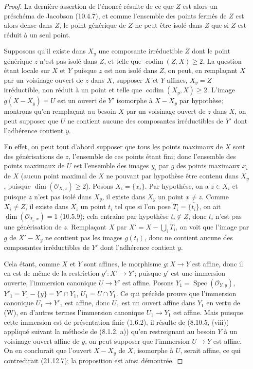 \begin{proof}
La dernière assertion de l'énoncé résulte de ce que $Z$ est alors un préschéma de
Jacobson (10.4.7), et comme l'ensemble des points fermés de $Z$ est alors dense dans
$Z$, le point générique de $Z$ ne peut être isolé dans $Z$ que si $Z$ est réduit à un
seul point.

Supposons qu'il existe dans $X_y$ une composante irréductible $Z$ dont le point
générique $z$ n'est pas isolé dans $Z$, et telle que $\operatorname{codim}(Z,X)\geq2$.
La question étant locale sur $X$ et $Y$ puisque $z$ est non isolé dans $Z$, on peut, en
remplaçant $X$ par un voisinage ouvert de $z$ dans $X$, supposer $X$ et $Y$ affines,
$X_y=Z$ irréductible, non réduit à un point et telle que
$\operatorname{codim}(X_y,X)\geq2$. L'image $g(X-X_y)=U$ est un ouvert de $Y'$
isomorphe à $X-X_y$ par hypothèse; montrons qu'en remplaçant au besoin $X$ par un
voisinage ouvert de $z$ dans $X$, on peut supposer que $U$ ne contient aucune des
composantes irréductibles de $Y'$ dont l'adhérence contient $y$.

En effet, on peut tout d'abord supposer que tous les points maximaux de $X$ sont des
générisations de $z$, l'ensemble de ces points étant fini; donc l'ensemble des points
maximaux de $U$ est l'ensemble des images $y_i$ par $g$ des points maximaux $x_i$ de
$X$ (aucun point maximal de $X$ ne pouvant par hypothèse être contenu dans $X_y$,
puisque $\dim(\mathcal O_{X,z})\geq2$). Posons $X_i=\overline{\{x_i\}}$. Par
hypothèse, on a $z\in X_i$ et puisque $z$ n'est pas isolé dans $X_y$, il existe dans
$X_y$ un point $x\ne z$. Comme $X_i\ne Z$, il existe dans $X_i$ un point $t_i$ tel
que si l'on pose $T_i=\overline{\{t_i\}}$, on ait $\dim(\mathcal O_{T_i,x})=1$
(10.5.9); cela entraîne par hypothèse $t_i\notin Z$, donc $t_i$ n'est pas une
générisation de $z$. Remplaçant $X$ par $X'=X-\bigcup_iT_i$, on voit que l'image par
$g$ de $X'-X_y$ ne contient pas les images $g(t_i)$, donc ne contient aucune des
composantes irréductibles de $Y'$ dont l'adhérence contient $y$.

Cela étant, comme $X$ et $Y$ sont affines, le morphisme $g:X\to Y$ est affine, donc il
en est de même de la restriction $g':X'\to Y'$; puisque $g'$ est une immersion ouverte,
l'immersion canonique $U\to Y'$ est affine. Posons
$Y_1=\operatorname{Spec}(\mathcal O_{Y,y})$, $Y'_1=Y_1-\{y\}=Y'\cap Y_1$,
$U_1=U\cap Y_1$. Ce qui précède prouve que l'immersion canonique $U_1\to Y'_1$ est
affine, donc $U_1$ est un ouvert affine dans $Y_1$ en vertu de (W), en d'autres termes
l'immersion canonique $U_1\to Y_1$ est affine. Mais puisque cette immersion est de
présentation finie (1.6.2), il résulte de (8.10.5, (viii)) appliqué suivant la méthode de
(8.1.2, a)) qu'en restreignant au besoin $Y$ à un voisinage ouvert affine de $y$, on peut
supposer que l'immersion $U\to Y$ est affine. On en conclurait que l'ouvert $X-X_y$ de
$X$, isomorphe à $U$, serait affine, ce qui contredirait (21.12.7); la proposition est
ainsi démontrée.
\end{proof}

